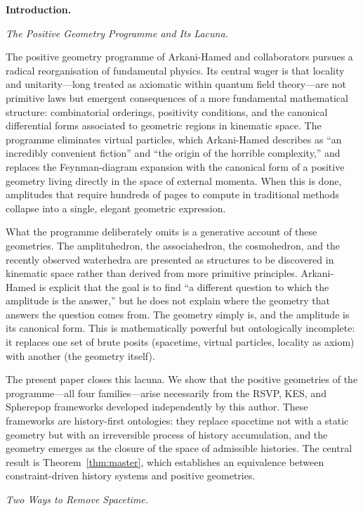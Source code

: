 \documentclass[12pt, oneside]{amsart}
\theoremstyle{plain}
\theoremstyle{definition}
\theoremstyle{remark}
\begin{document}
\bigskip\noindent\textbf{Introduction.}
\label{sec:intro}

\medskip\noindent\textit{The Positive Geometry Programme and Its Lacuna.}

The positive geometry programme of Arkani-Hamed and collaborators pursues a radical reorganisation of fundamental physics. Its central wager is that locality and unitarity---long treated as axiomatic within quantum field theory---are not primitive laws but emergent consequences of a more fundamental mathematical structure: combinatorial orderings, positivity conditions, and the canonical differential forms associated to geometric regions in kinematic space. The programme eliminates virtual particles, which Arkani-Hamed describes as ``an incredibly convenient fiction'' and ``the origin of the horrible complexity,'' and replaces the Feynman-diagram expansion with the canonical form of a positive geometry living directly in the space of external momenta. When this is done, amplitudes that require hundreds of pages to compute in traditional methods collapse into a single, elegant geometric expression.

What the programme deliberately omits is a generative account of these geometries. The amplituhedron, the associahedron, the cosmohedron, and the recently observed waterhedra are presented as structures to be discovered in kinematic space rather than derived from more primitive principles. Arkani-Hamed is explicit that the goal is to find ``a different question to which the amplitude is the answer,'' but he does not explain where the geometry that answers the question comes from. The geometry simply is, and the amplitude is its canonical form. This is mathematically powerful but ontologically incomplete: it replaces one set of brute posits (spacetime, virtual particles, locality as axiom) with another (the geometry itself).

The present paper closes this lacuna. We show that the positive geometries of the programme---all four families---arise necessarily from the RSVP, KES, and Spherepop frameworks developed independently by this author. These frameworks are history-first ontologies: they replace spacetime not with a static geometry but with an irreversible process of history accumulation, and the geometry emerges as the closure of the space of admissible histories. The central result is Theorem~\ref{thm:master}, which establishes an equivalence between constraint-driven history systems and positive geometries.

\medskip\noindent\textit{Two Ways to Remove Spacetime.}
\end{document}
